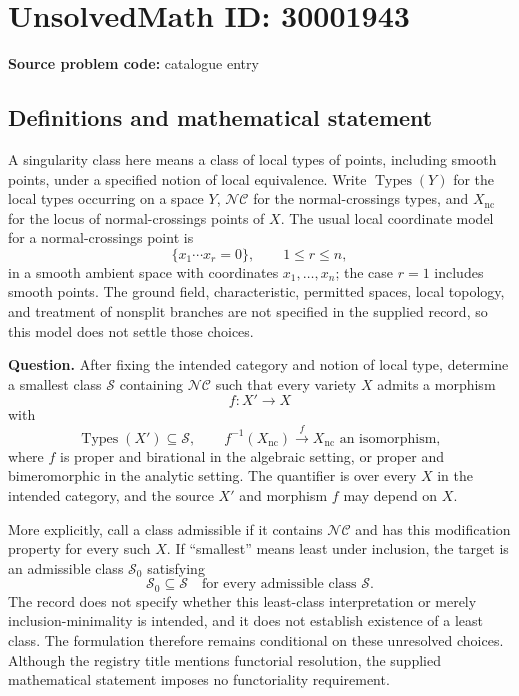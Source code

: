 \documentclass[11pt]{article}
\begin{document}
\section*{UnsolvedMath ID: 30001943}
\textbf{Source problem code:} catalogue entry
\subsection{Definitions and mathematical statement}
A singularity class here means a class of local types of points, including smooth points, under a specified notion of local equivalence. Write \(\operatorname{Types}(Y)\) for the local types occurring on a space \(Y\), \(\mathcal{NC}\) for the normal-crossings types, and \(X_{\mathrm{nc}}\) for the locus of normal-crossings points of \(X\). The usual local coordinate model for a normal-crossings point is
\[
\{x_1\cdots x_r=0\},\qquad 1\leq r\leq n,
\]
in a smooth ambient space with coordinates \(x_1,\ldots,x_n\); the case \(r=1\) includes smooth points. The ground field, characteristic, permitted spaces, local topology, and treatment of nonsplit branches are not specified in the supplied record, so this model does not settle those choices.

\textbf{Question.} After fixing the intended category and notion of local type, determine a smallest class \(\mathcal S\) containing \(\mathcal{NC}\) such that every variety \(X\) admits a morphism
\[
f\colon X'\longrightarrow X
\]
with
\[
\operatorname{Types}(X')\subseteq\mathcal S,
\qquad
f^{-1}(X_{\mathrm{nc}})\xrightarrow{\;f\;}X_{\mathrm{nc}}
\text{ an isomorphism},
\]
where \(f\) is proper and birational in the algebraic setting, or proper and bimeromorphic in the analytic setting. The quantifier is over every \(X\) in the intended category, and the source \(X'\) and morphism \(f\) may depend on \(X\).

More explicitly, call a class admissible if it contains \(\mathcal{NC}\) and has this modification property for every such \(X\). If ``smallest'' means least under inclusion, the target is an admissible class \(\mathcal S_0\) satisfying
\[
\mathcal S_0\subseteq\mathcal S
\quad\text{for every admissible class }\mathcal S.
\]
The record does not specify whether this least-class interpretation or merely inclusion-minimality is intended, and it does not establish existence of a least class. The formulation therefore remains conditional on these unresolved choices. Although the registry title mentions functorial resolution, the supplied mathematical statement imposes no functoriality requirement.
\end{document}
